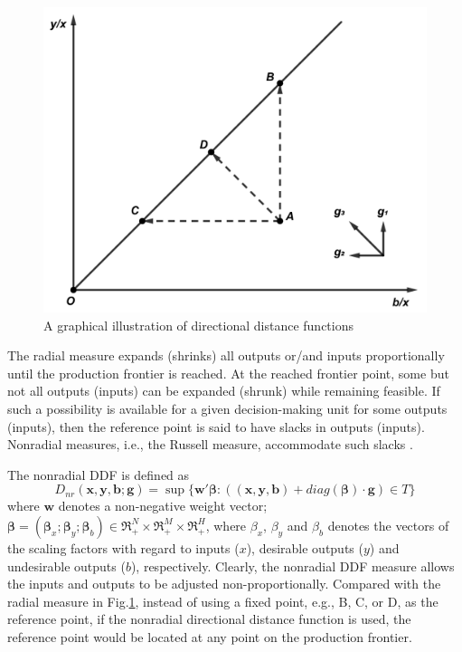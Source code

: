 \begin{figure}[ht]
    \centering
    \includegraphics[scale=0.5]{SJF1.pdf}
    \caption{A graphical illustration of directional distance functions} 
    \label{fig_ddf}
\end{figure}

The radial measure expands (shrinks) all outputs or/and inputs proportionally until the production frontier is reached. At the reached frontier point, some but not all outputs (inputs) can be expanded (shrunk) while remaining feasible. If such a possibility is available for a given decision-making unit for some outputs (inputs), then the reference point is said to have slacks in outputs (inputs). Nonradial measures, i.e., the Russell measure, accommodate such slacks \citep{Chambers2002,Fare2010,Zhou2012}.

The nonradial DDF is defined as
\begin{equation}\label{eq_ddf_nr}
    D_{nr} (\pmb{x},\pmb{y},\pmb{b};\pmb{g}) = \sup \{ \pmb{w'} \pmb{\beta} :((\pmb{x},\pmb{y},\pmb{b}) + \textit{diag}(\pmb{\beta}) \cdot \pmb{g}) \in T \} 
\end{equation}
where $\pmb{w}$ denotes a non-negative weight vector; ${\pmb{\beta }} = ({{\pmb{\beta}}_x};{{\pmb{\beta }}_y};{{\pmb{\beta}}_b}) \in \Re _ + ^N \times \Re _ + ^M \times \Re _+ ^H$, where $\beta_x$, $\beta_y$  and $\beta_b$  denotes the vectors of the scaling factors with regard to inputs ($x$), desirable outputs ($y$) and undesirable outputs ($b$), respectively. 
Clearly, the nonradial DDF measure allows the inputs and outputs to be adjusted non-proportionally. Compared with the radial measure in Fig.\ref{fig_ddf}, instead of using a fixed point, e.g., B, C, or D, as the reference point, if the nonradial directional distance function is used, the reference point would be located at any point on the production frontier.
 

